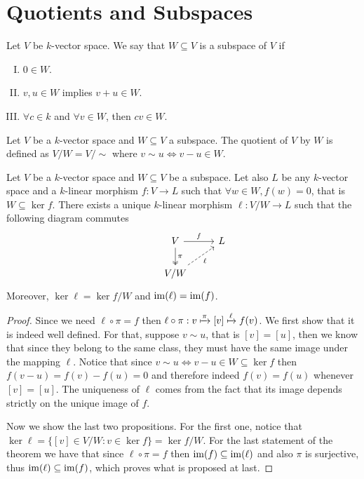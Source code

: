 \section{Quotients and Subspaces}

\begin{definition}[Subspace]\label{def: subspace}
   Let \(V\) be \(k\)-vector space. We say that \(W \subseteq  V\) is a subspace
   of \(V\) if
   \begin{enumerate}[I.]
     \item \(0 \in W\).
     \item \(v, u \in W\) implies \(v + u \in W\).
     \item \(\forall c \in k\) and \(\forall v \in W\), then \(cv \in W\).
   \end{enumerate}
\end{definition}

\begin{definition}[Quotient]\label{def: quotient}
   Let \(V\) be a \(k\)-vector space and \(W \subseteq V\) a subspace. The
   quotient of \(V\) by \(W\) is defined as \(V/W = V/{\sim}\) where \(v
   \sim u \Leftrightarrow v - u \in W\).
\end{definition}

\begin{theorem}
  \label{thm: universal property for quotients}
  Let \(V\) be a \(k\)-vector space and \(W \subseteq V\) be a subspace. Let
  also \(L\) be any \(k\)-vector space and a \(k\)-linear morphism \(f : V \to L
  \) such that \(\forall w \in W, f(w) = 0\), that is \(W \subseteq \ker f\).
  There exists a unique \(k\)-linear morphism \(\ell: V/W \to L\) such that the
  following diagram commutes
  \[
    \begin{tikzcd}
       &V \ar["f", r] \ar["\pi", twoheadrightarrow, d] &L \\
       &V/W \ar[swap, dashed, "\ell", ru]
    \end{tikzcd}
  \]
  Moreover, \(\ker \ell = \ker f / W\) and  \(\operatorname{im}(\ell) = \operatorname{im}(f)\).
\end{theorem}

\begin{proof}
  Since we need \(\ell \circ \pi = f\) then \(\ell \circ \pi : v \xmapsto \pi
  [v] \xmapsto \ell f(v)\). We first show that it is indeed well
  defined. For that, suppose \(v \sim u\), that is \([v] =
  [u]\), then we know that since they belong to the same class, they must have the
  same image under the mapping \(\ell\). Notice that since \(v \sim u
  \Leftrightarrow v - u \in W \subseteq \ker f\) then \(f(v - u) = f(v) - f(u) =
  0\) and therefore indeed \(f(v) = f(u)\) whenever \([v] =
  [u]\). The uniqueness of \(\ell\) comes from the fact that its image depends
  strictly on the unique image of \(f\).

  Now we show the last two propositions. For the first one, notice that \(\ker
  \ell = \{[v] \in V/W : v \in \ker f\} = \ker f / W\). For the last
  statement of the theorem we have that since \(\ell \circ \pi = f\) then
  \(\operatorname{im}(f) \subseteq \operatorname{im}(\ell)\) and also \(\pi\) is surjective, thus
  \(\operatorname{im}(\ell) \subseteq \operatorname{im}(f)\), which proves what is proposed at last.
\end{proof}

